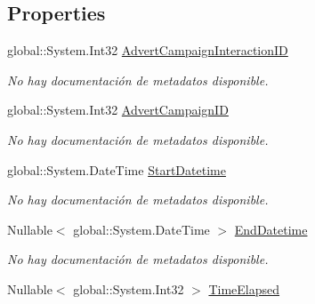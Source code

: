 \subsection*{Properties}
\begin{DoxyCompactItemize}
\item 
global\-::\-System.\-Int32 \hyperlink{class_game_memory_1_1_advert_campaign_interactions_a100229f66f8386d876b9ae09a16e2b2d}{Advert\-Campaign\-Interaction\-I\-D}
\begin{DoxyCompactList}\small\item\em No hay documentación de metadatos disponible. \end{DoxyCompactList}\item 
global\-::\-System.\-Int32 \hyperlink{class_game_memory_1_1_advert_campaign_interactions_a1f5ba2d040aee7f7c01dcec6e48cf4d0}{Advert\-Campaign\-I\-D}
\begin{DoxyCompactList}\small\item\em No hay documentación de metadatos disponible. \end{DoxyCompactList}\item 
global\-::\-System.\-Date\-Time \hyperlink{class_game_memory_1_1_advert_campaign_interactions_ab45778d100a4712092c7e4596a0f202b}{Start\-Datetime}
\begin{DoxyCompactList}\small\item\em No hay documentación de metadatos disponible. \end{DoxyCompactList}\item 
Nullable$<$ global\-::\-System.\-Date\-Time $>$ \hyperlink{class_game_memory_1_1_advert_campaign_interactions_ab6ed1c939196344d74d443aca721c5e1}{End\-Datetime}
\begin{DoxyCompactList}\small\item\em No hay documentación de metadatos disponible. \end{DoxyCompactList}\item 
Nullable$<$ global\-::\-System.\-Int32 $>$ \hyperlink{class_game_memory_1_1_advert_campaign_interactions_a7bd92a415be6927712becae96824e73d}{Time\-Elapsed}

\end{DoxyCompactItemize}
